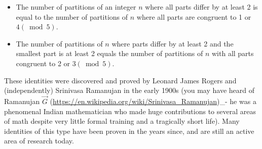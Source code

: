 \documentclass{article}
\theoremstyle{definition}
\begin{document}
\begin{itemize}
  \item The number of partitions of an integer $n$ where all parts differ by at least 2 is equal to the number of partitions of $n$ where all parts are congruent to 1 or $4(\bmod 5)$.
  \item The number of partitions of $n$ where parts differ by at least 2 and the smallest part is at least 2 equals the number of partitions of $n$ with all parts congruent to 2 or $3(\bmod 5)$.
\end{itemize}

These identities were discovered and proved by Leonard James Rogers and (independently) Srinivasa Ramanujan in the early 1900s (you may have heard of Ramanujan $\vec{G}$ (\href{https://en.wikipedia.org/wiki/Srinivasa_Ramanujan}{https://en.wikipedia.org/wiki/Srinivasa\_Ramanujan})\_- he was a phenomenal Indian mathematician who made huge contributions to several areas of math despite very little formal training and a tragically short life). Many identities of this type have been proven in the years since, and are still an active area of research today.
\end{document}
